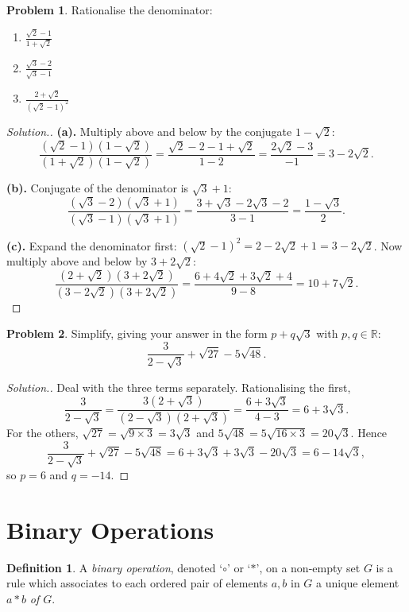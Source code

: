\documentclass[11pt,a4paper]{article}
\theoremstyle{definition}
\newtheorem{definition}[thm]{Definition}
\newtheorem{problemx}{Problem}[section]
\newenvironment{problem}{\begin{problemx}}{\end{problemx}}
\newenvironment{solution}
  {\renewcommand{\qedsymbol}{}\begin{proof}[\textit{Solution}.]}
  {\end{proof}}
\begin{document}
\begin{problem}
Rationalise the denominator:
\begin{enumerate}
\item[(a).] $\frac{\sqrt{2}-1}{1+\sqrt{2}}$
\item[(b).] $\frac{\sqrt{3}-2}{\sqrt{3}-1}$
\item[(c).] $\frac{2+\sqrt{2}}{\left(\sqrt{2}-1\right)^{2}}$
\end{enumerate}
\end{problem}

\begin{solution}
\textbf{(a).} Multiply above and below by the conjugate $1-\sqrt{2}$:
$$\frac{\left(\sqrt{2}-1\right)\left(1-\sqrt{2}\right)}
       {\left(1+\sqrt{2}\right)\left(1-\sqrt{2}\right)}
=\frac{\sqrt{2}-2-1+\sqrt{2}}{1-2}
=\frac{2\sqrt{2}-3}{-1}=3-2\sqrt{2}.$$

\textbf{(b).} Conjugate of the denominator is $\sqrt{3}+1$:
$$\frac{\left(\sqrt{3}-2\right)\left(\sqrt{3}+1\right)}
       {\left(\sqrt{3}-1\right)\left(\sqrt{3}+1\right)}
=\frac{3+\sqrt{3}-2\sqrt{3}-2}{3-1}
=\frac{1-\sqrt{3}}{2}.$$

\textbf{(c).} Expand the denominator first:
$\left(\sqrt{2}-1\right)^{2}=2-2\sqrt{2}+1=3-2\sqrt{2}$. Now multiply above and
below by $3+2\sqrt{2}$:
$$\frac{\left(2+\sqrt{2}\right)\left(3+2\sqrt{2}\right)}{\left(3-2\sqrt{2}\right)\left(3+2\sqrt{2}\right)}
=\frac{6+4\sqrt{2}+3\sqrt{2}+4}{9-8}
=10+7\sqrt{2}.$$
\end{solution}

\pagebreak

\begin{problem}
Simplify, giving your answer in the form $p+q\sqrt{3}$ with $p,q\in\mathbb{R}$:
$$\frac{3}{2-\sqrt{3}}+\sqrt{27}-5\sqrt{48}.$$
\end{problem}

\begin{solution}
Deal with the three terms separately. Rationalising the first,
$$\frac{3}{2-\sqrt{3}}=\frac{3\left(2+\sqrt{3}\right)}{\left(2-\sqrt{3}\right)\left(2+\sqrt{3}\right)}
=\frac{6+3\sqrt{3}}{4-3}=6+3\sqrt{3}.$$
For the others, $\sqrt{27}=\sqrt{9\times 3}=3\sqrt{3}$ and
$5\sqrt{48}=5\sqrt{16\times 3}=20\sqrt{3}$. Hence
$$\frac{3}{2-\sqrt{3}}+\sqrt{27}-5\sqrt{48}
=6+3\sqrt{3}+3\sqrt{3}-20\sqrt{3}=6-14\sqrt{3},$$
so $p=6$ and $q=-14$.
\end{solution}

\section{Binary Operations}
\begin{definition}
A \emph{binary operation}, denoted `$\circ$' or `$*$', on a non-empty set $G$ is a
rule which associates to each ordered pair of elements $a,b$ in $G$ a unique
element $a*b$ \emph{of $G$}.
\end{definition}
\end{document}
